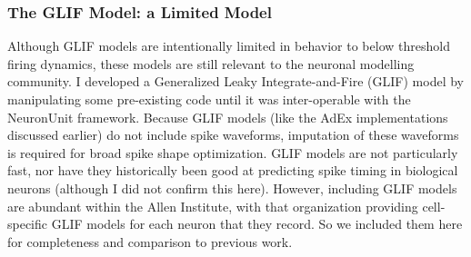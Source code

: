 



\subsubsection{The GLIF Model: a Limited Model}
Although GLIF models are intentionally limited in behavior to below threshold firing dynamics, these models are still relevant to the neuronal modelling community.
I developed a Generalized Leaky Integrate-and-Fire (GLIF) model by manipulating some pre-existing code until it was inter-operable with the NeuronUnit framework.
Because GLIF models (like the AdEx implementations discussed earlier) do not include spike waveforms, imputation of these waveforms is required for broad spike shape optimization.
GLIF models are not particularly fast, nor have they historically been good at predicting  spike timing in biological neurons \cite{teeter2018generalized} (although I did not confirm this here).
However, including GLIF models are abundant within the Allen Institute, with that organization providing cell-specific GLIF models for each neuron that they record.
So we included them here for completeness and comparison to previous work.

